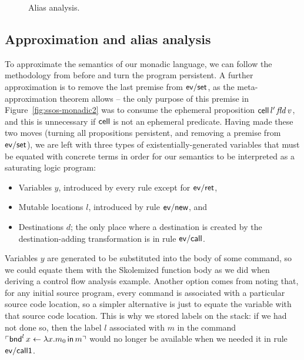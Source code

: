 \begin{figure}
\caption{Alias analysis.}
\label{fig:ssos-monadic-approx}
\end{figure}



\subsection{Approximation and alias analysis}


To approximate the semantics of our monadic language, we can follow the
methodology from before and turn the program persistent. A further
approximation is to remove the last premise from ${\sf ev/set}$, as
the meta-approximation theorem allows -- the only purpose of this
premise in Figure~\ref{fig:ssos-monadic2} was to consume the ephemeral
proposition ${\sf cell}\,l'\,{\it fld}\,v$, and this is unnecessary
if ${\sf cell}$ is not an ephemeral predicate.  Having
made these two moves (turning all propositions persistent, and removing
a premise from ${\sf ev/set}$), we are left with three types of
existentially-generated variables that must be equated with concrete
terms in order for our semantics to be interpreted as a saturating
logic program:

\smallskip
\begin{itemize}
\item Variables $y$, introduced by every rule except for ${\sf ev/ret}$,
\item Mutable locations $l$, introduced by rule ${\sf ev/new}$, and 
\item Destinations $d$; the only place where a destination is created
by the destination-adding transformation is in rule ${\sf ev/call}$.
\end{itemize}
\smallskip

Variables $y$ are generated to be substituted into the body of some
command, so we could equate them with the Skolemized function body as
we did when deriving a control flow analysis example. Another option
comes from noting that, for any initial source program, every command
is associated with a particular source code location, so a simpler
alternative is just to equate the variable with that source code
location. This is why we stored labels on the stack: if we had not
done so, then the label $l$ associated with $m$ in the command
${\ulcorner{{\sf bnd}^l\, x \leftarrow \lambda x.m_0 \,{\sf in}\,m}\urcorner}$ would
no longer be available when we needed it in rule ${\sf ev/call1}$.

